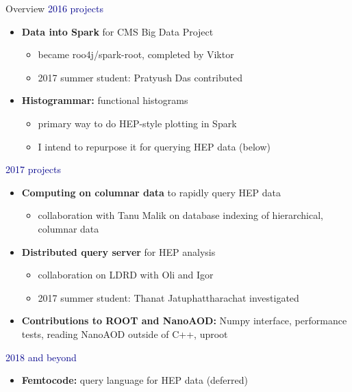 \documentclass{beamer}
\begin{document}
\begin{frame}{Overview}
\vspace{0.25 cm}
\textcolor{darkblue}{2016 projects}
\begin{itemize}
\item {\bf Data into Spark} for CMS Big Data Project
\begin{itemize}
\item became roo4j/spark-root, completed by Viktor
\item 2017 summer student: Pratyush Das contributed
\end{itemize}

\item {\bf Histogrammar:} functional histograms
\begin{itemize}
\item primary way to do HEP-style plotting in Spark
\item I intend to repurpose it for querying HEP data (below)
\end{itemize}
\end{itemize}

\textcolor{darkblue}{2017 projects}
\begin{itemize}
\item {\bf Computing on columnar data} to rapidly query HEP data
\begin{itemize}
\item collaboration with Tanu Malik on database indexing of hierarchical, columnar data
\end{itemize}

\item {\bf Distributed query server} for HEP analysis
\begin{itemize}
\item collaboration on LDRD with Oli and Igor
\item 2017 summer student: Thanat Jatuphattharachat investigated
\end{itemize}

\item {\bf Contributions to ROOT and NanoAOD:} Numpy interface, performance tests, reading NanoAOD outside of C++, uproot
\end{itemize}

\textcolor{darkblue}{2018 and beyond}
\begin{itemize}
\item {\bf Femtocode:} query language for HEP data (deferred)
\end{itemize}
\end{frame}
\end{document}
